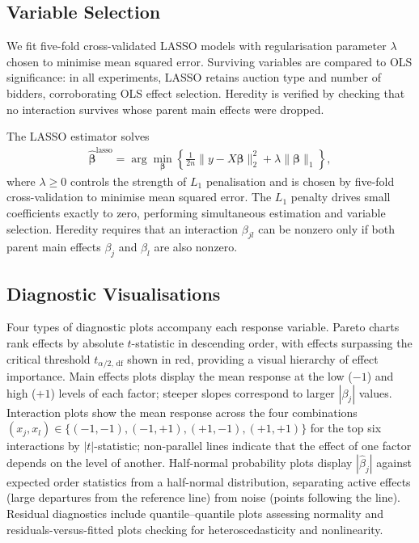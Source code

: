 \subsection{Variable Selection}

We fit five-fold cross-validated LASSO models with regularisation parameter $\lambda$ chosen to minimise mean squared error. Surviving variables are compared to OLS significance: in all experiments, LASSO retains auction type and number of bidders, corroborating OLS effect selection. Heredity is verified by checking that no interaction survives whose parent main effects were dropped.

The LASSO estimator \citep{Tibshirani1996} solves
\begin{align}
  \hat{\boldsymbol{\beta}}^{\text{lasso}} = \arg\min_{\boldsymbol{\beta}} \left\{ \frac{1}{2n} \|y - X\boldsymbol{\beta}\|_2^2 + \lambda \|\boldsymbol{\beta}\|_1 \right\},
  \label{eq:lasso}
\end{align}
where $\lambda \geq 0$ controls the strength of $L_1$ penalisation and is chosen by five-fold cross-validation to minimise mean squared error. The $L_1$ penalty drives small coefficients exactly to zero, performing simultaneous estimation and variable selection. Heredity requires that an interaction $\beta_{jl}$ can be nonzero only if both parent main effects $\beta_j$ and $\beta_l$ are also nonzero.

\subsection{Diagnostic Visualisations}

Four types of diagnostic plots accompany each response variable. Pareto charts rank effects by absolute $t$-statistic in descending order, with effects surpassing the critical threshold $t_{\alpha/2,\,\text{df}}$ shown in red, providing a visual hierarchy of effect importance. Main effects plots display the mean response at the low ($-1$) and high ($+1$) levels of each factor; steeper slopes correspond to larger $|\beta_j|$ values. Interaction plots show the mean response across the four combinations $(x_j, x_l) \in \{(-1,-1), (-1,+1), (+1,-1), (+1,+1)\}$ for the top six interactions by $|t|$-statistic; non-parallel lines indicate that the effect of one factor depends on the level of another. Half-normal probability plots display $|\hat{\beta}_j|$ against expected order statistics from a half-normal distribution, separating active effects (large departures from the reference line) from noise (points following the line). Residual diagnostics include quantile--quantile plots assessing normality and residuals-versus-fitted plots checking for heteroscedasticity and nonlinearity.

